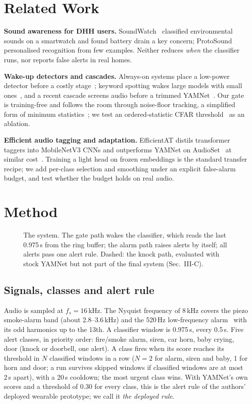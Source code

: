 \documentclass[conference]{IEEEtran}
\begin{document}
\section{Related Work}
\textbf{Sound awareness for DHH users.} SoundWatch~\cite{jain2020soundwatch} classified environmental sounds on a
smartwatch and found battery drain a key concern; ProtoSound~\cite{jain2022protosound} personalised recognition from few
examples. Neither reduces \emph{when} the classifier runs, nor reports false alerts in real homes.

\textbf{Wake-up detectors and cascades.} Always-on systems place a low-power detector before a costly
stage~\cite{wakeupreview}; keyword spotting wakes large models with small ones~\cite{gruenstein2017cascade}, and a recent
cascade screens audio before a trimmed YAMNet~\cite{violencecascade2026}. Our gate is training-free and follows the room
through noise-floor tracking, a simplified form of minimum statistics~\cite{martin2001noise}; we test an
ordered-statistic CFAR threshold~\cite{rohling1983cfar} as an ablation.

\textbf{Efficient audio tagging and adaptation.} EfficientAT distils transformer taggers into MobileNetV3 CNNs and
outperforms YAMNet on AudioSet~\cite{gemmeke2017audioset} at similar cost~\cite{schmid2023efficientat}. Training a light
head on frozen embeddings is the standard transfer recipe; we add per-class selection and smoothing under an explicit
false-alarm budget, and test whether the budget holds on real audio.

\section{Method}
\begin{figure}[t]
\centering\resizebox{0.95\textwidth}{!}{}
\caption{The system. The gate path wakes the classifier, which reads the last 0.975\,s from the ring buffer; the
alarm path raises alerts by itself; all alerts pass one alert rule. Dashed: the knock path, evaluated with stock YAMNet
but not part of the final system (Sec.~III-C).}\label{fig:block}
\end{figure}
\subsection{Signals, classes and alert rule}
Audio is sampled at $f_s=16$\,kHz. The Nyquist frequency of 8\,kHz covers the piezo smoke-alarm band (about
2.8--3.6\,kHz) and the 520\,Hz low-frequency alarm~\cite{nfpa72} with its odd harmonics up to the 13th. A classifier
window is 0.975\,s, every 0.5\,s. Five alert classes, in priority order: fire/smoke alarm, siren, car horn, baby crying,
door (knock or doorbell, one alert). A class fires when its score reaches its threshold in $N$ classified windows in a
row ($N=2$ for alarm, siren and baby, 1 for horn and door; a run survives skipped windows if classified windows are at
most 2\,s apart), with a 20\,s cooldown; the most urgent class wins. With YAMNet's own scores and a threshold of 0.30 for
every class, this is the alert rule of the authors' deployed wearable prototype; we call it \emph{the deployed rule}.
\end{document}
